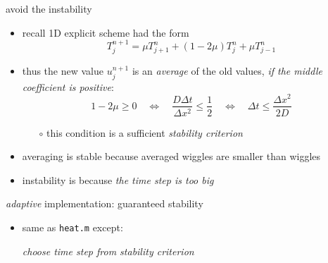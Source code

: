 \begin{frame}{avoid the instability}
\label{slide:maxprinc}

\begin{itemize}
\item recall 1D explicit scheme had the form 
	$$T_j^{n+1} = \mu T_{j+1}^n + (1 - 2 \mu) T_j^n + \mu T_{j-1}^n$$
\item thus the new value $u_j^{n+1}$ is an \emph{average} of the old values, \emph{if the middle coefficient is positive}:
	$$1 - 2 \mu \ge 0 \quad \iff \quad  \frac{D\Delta t}{\Delta x^2} \le \frac{1}{2} \quad \iff \quad \Delta t \le \frac{\Delta x^2}{2 D}$$
    \begin{itemize}
    \item[$\circ$] this condition is a sufficient \emph{stability criterion}
    \end{itemize}
\item averaging is stable because averaged wiggles are smaller than wiggles
\item instability is because \emph{the time step is too big}
\end{itemize}
\end{frame}


\begin{frame}{\textsl{adaptive} implementation: guaranteed stability}


\begin{itemize}
\item same as \texttt{heat.m} except:

\begin{center}
\emph{choose time step from stability criterion}
\end{center}
\end{itemize}\end{frame}


